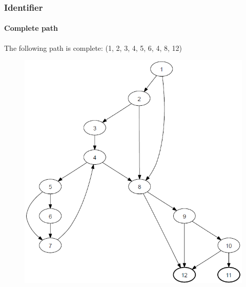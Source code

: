 \begin{frame}[hasprev=false,hasnext=false]
\label{example:identifier-complete-path}
\frametitle{Identifier}
\framesubtitle{Complete path}

The following path is complete: (1, 2, 3, 4, 5, 6, 4, 8, 12)

\begin{figure}
	\centering
	\includegraphics[scale=.3]{aux/examples/identifier-complete-path/identifier-java-cfg}
\end{figure}
\end{frame}
